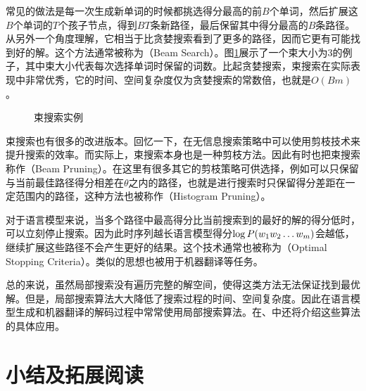 \parinterval 常见的做法是每一次生成新单词的时候都挑选得分最高的前$B$个单词，然后扩展这$B$个单词的$T$个孩子节点，得到$BT$条新路径，最后保留其中得分最高的$B$条路径。从另外一个角度理解，它相当于比贪婪搜索看到了更多的路径，因而它更有可能找到好的解。这个方法通常被称为{\small{}}（Beam Search）。图\ref{fig:2-18}展示了一个束大小为3的例子，其中束大小代表每次选择单词时保留的词数。比起贪婪搜索，束搜索在实际表现中非常优秀，它的时间、空间复杂度仅为贪婪搜索的常数倍，也就是$O(Bm)$。

\begin{figure}[htp]
    \centering
 	
	\caption{束搜索实例}
    \label{fig:2-18}
\end{figure}

\parinterval 束搜索也有很多的改进版本。回忆一下，在无信息搜索策略中可以使用剪枝技术来提升搜索的效率。而实际上，束搜索本身也是一种剪枝方法。因此有时也把束搜索称作{\small{}}（Beam Pruning）。在这里有很多其它的剪枝策略可供选择，例如可以只保留与当前最佳路径得分相差在$\theta$之内的路径，也就是进行搜索时只保留得分差距在一定范围内的路径，这种方法也被称作{\small{}}（Histogram Pruning）。

\parinterval 对于语言模型来说，当多个路径中最高得分比当前搜索到的最好的解的得分低时，可以立刻停止搜索。因为此时序列越长语言模型得分$\log {P}(w_1 w_2 \ldots w_m)$会越低，继续扩展这些路径不会产生更好的结果。这个技术通常也被称为{\small{}}（Optimal Stopping Criteria）。类似的思想也被用于机器翻译等任务。

\parinterval 总的来说，虽然局部搜索没有遍历完整的解空间，使得这类方法无法保证找到最优解。但是，局部搜索算法大大降低了搜索过程的时间、空间复杂度。因此在语言模型生成和机器翻译的解码过程中常常使用局部搜索算法。在{\chapterseven}、{\chapterten}中还将介绍这些算法的具体应用。


\sectionnewpage
\section{小结及拓展阅读} \label{sec2:summary}

